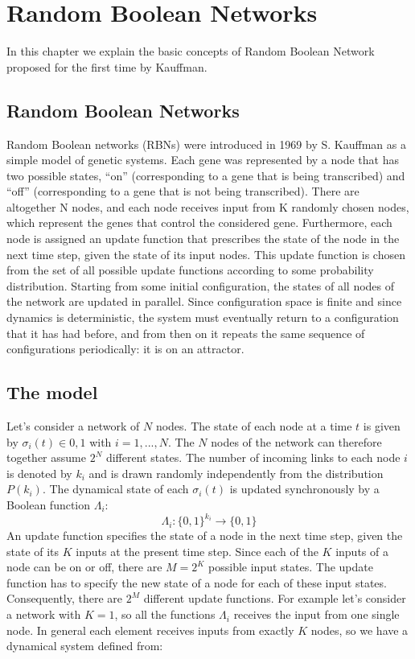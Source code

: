 \chapter{Random Boolean Networks}
\lhead[\fancyplain{}{\bfseries\thepage}]{\fancyplain{}{\bfseries\rightmark}}


In this chapter we explain the basic concepts of Random Boolean Network proposed for the first time by Kauffman.

\section{Random Boolean Networks}
Random Boolean networks (RBNs) were introduced in
1969 by S. Kauffman as a simple model of genetic systems.
Each gene was represented by a node
that has two possible states, “on” (corresponding to a
gene that is being transcribed) and “off” (corresponding
to a gene that is not being transcribed). There are altogether N nodes, and each node receives input from K
randomly chosen nodes, which represent the genes that
control the considered gene. Furthermore, each node is
assigned an update function that prescribes the state of
the node in the next time step, given the state of its input nodes. This update function is chosen from the set
of all possible update functions according to some probability distribution. Starting from some initial configuration, the states of all nodes of the network are updated
in parallel. Since configuration space is finite and since
dynamics is deterministic, the system must eventually return to a configuration that it has had before, and from
then on it repeats the same sequence of configurations
periodically: it is on an attractor.

\section{The model}
Let's consider a network of $N$ nodes. The state of each node at a time $t$ is given by $\sigma_i(t) \in {0,1}$ with $ i = 1,...,N$.
The $N$ nodes of the network can therefore together assume $2^N$ different states.
The number of incoming links to each node $i$  is denoted by $k_i$ and is drawn
randomly independently from the distribution $P(k_i)$.
The dynamical state of each $\sigma_i(t)$ is updated synchronously by a Boolean function $\Lambda_i$:
$$
\Lambda_i:\{0,1\}^{k_i} \to \{0,1\}
$$ 
An update function specifies
the state of a node in the next time step, given the state
of its $K$ inputs at the present time step. Since each of the
$K$ inputs of a node can be on or off, there are $M = 2^K$ possible input states.
The update function has to specify the new state of a node for each of these input states.
Consequently, there are $2^M$ different update functions.
For example let's consider a network with $K=1$, so all the functions $\Lambda_i$ receives the input from one single node. 
In general each element 
receives inputs from exactly $K$ nodes, so we have a dynamical system defined from:


